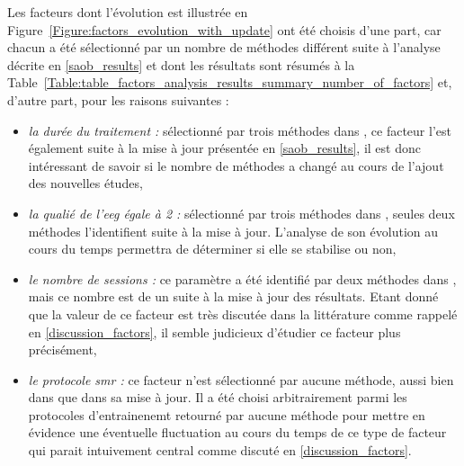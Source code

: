 Les facteurs dont l'évolution est illustrée en 
Figure~\ref{Figure:factors_evolution_with_update} ont été choisis d'une part, car chacun a été sélectionné par un nombre de méthodes différent suite à l'analyse décrite en \ref{saob_results}
et dont les résultats sont résumés à la Table~\ref{Table:table_factors_analysis_results_summary_number_of_factors} et, d'autre part, pour les raisons suivantes :
\begin{itemize}
\item \textsl{la durée du traitement :} sélectionné par trois méthodes dans \citet{Bussalb2019clinical}, ce facteur l'est également suite à la mise à jour présentée en \ref{saob_results},
il est donc intéressant de savoir si le nombre de méthodes a changé au cours de l'ajout des nouvelles études,
\item \textsl{la qualié de l'\gls{eeg} égale à 2 :} sélectionné par trois méthodes dans \citet{Bussalb2019clinical}, seules deux méthodes l'identifient suite à la mise à jour.
L'analyse de son évolution au cours du temps permettra de déterminer si elle se stabilise ou non,
\item \textsl{le nombre de sessions :} ce paramètre a été identifié par deux méthodes dans \citet{Bussalb2019clinical}, mais ce nombre est de un suite à la mise à jour des résultats.
Etant donné que la valeur de ce facteur est très discutée dans la littérature comme rappelé en \ref{discussion_factors}, il semble judicieux d'étudier ce facteur plus précisément,
\item \textsl{le protocole \gls{smr} :} ce facteur n'est sélectionné par aucune méthode, aussi bien dans \citet{Bussalb2019clinical} que dans sa mise à jour. Il a été choisi arbitrairement
parmi les protocoles d'entrainenemt retourné par aucune méthode pour mettre en évidence une éventuelle fluctuation au cours du temps de ce type de facteur qui parait intuivement central comme
discuté en \ref{discussion_factors}.
\end{itemize}


